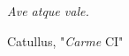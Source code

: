 \thispagestyle{empty}
\null{}
\begin{flushright} \large
\epigraph{\Large\textit{Ave atque vale.}}{Catullus, "\emph{Carme} \scshape{CI}"}
\end{flushright}
\null	
\clearpage